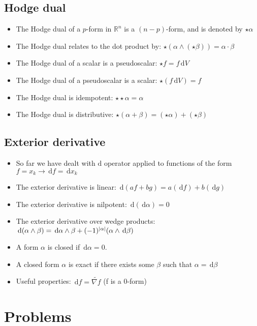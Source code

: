 \documentclass[a4paper,11pt]{report}
\newcommand{\real}{\ensuremath{\mathbb{R}}}
\newcommand{\diff}{\ensuremath{\, \mathrm{d}}}
\DeclarePairedDelimiter{\abs}{\lvert}{\rvert}
\begin{document}
\section{Hodge dual}
\begin{itemize} \itemsep -2pt
    \item The Hodge dual of a $p$-form in $\real^n$ is a $(n - p)$-form, and is denoted by $\star \alpha$
    \item The Hodge dual relates to the dot product by: $\star (\alpha \wedge (\star \beta)) = \alpha \cdot \beta$
    \item The Hodge dual of a scalar is a pseudoscalar: $\star f = f \diff V$
    \item The Hodge dual of a pseudoscalar is a scalar: $\star (f \diff V) = f$
    \item The Hodge dual is idempotent: $\star \star \alpha = \alpha$
    \item The Hodge dual is distributive: $\star (\alpha + \beta) = (\star \alpha) + (\star \beta)$
\end{itemize}

\section{Exterior derivative}
\begin{itemize} \itemsep -2pt
    \item So far we have dealt with $\mathrm{d}$ operator applied to functions of the form $f = x_k \to \diff f = \diff x_k$
    \item The exterior derivative is linear: $\diff (a f + b g) = a (\diff f) + b (\diff g)$
    \item The exterior derivative is nilpotent: $\diff (\diff \alpha) = 0$
    \item The exterior derivative over wedge products: $\diff (\alpha \wedge \beta) = \diff \alpha \wedge \beta + (-1)^{\abs{\alpha}} (\alpha \wedge \diff \beta)$
    \item A form $\alpha$ is closed if $\diff \alpha = 0$.
    \item A closed form $\alpha$ is exact if there exists some $\beta$ such that $\alpha = \diff \beta$
    \item Useful properties:
        $\diff f = \widetilde{\nabla f}$ (f is a 0-form)
\end{itemize}

\chapter{Problems}
\end{document}
